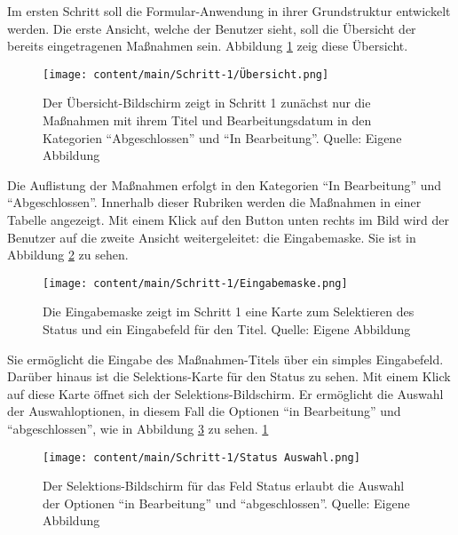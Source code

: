 

Im ersten Schritt soll die Formular-Anwendung  in ihrer Grundstruktur entwickelt werden. Die erste Ansicht, welche der Benutzer sieht, soll die Übersicht der bereits eingetragenen Maßnahmen sein. Abbildung \ref{fig:Schritt1Uebersicht} zeig diese Übersicht. 
\begin{figure}[H]
	\centering
    \texttt{[image: content/main/Schritt-1/Übersicht.png]}
	\caption[Schritt 1 Übersicht]{Der Übersicht-Bildschirm zeigt in  Schritt 1 zunächst nur die Maßnahmen mit ihrem Titel und Bearbeitungsdatum in den Kategorien \enquote{Abgeschlossen} und \enquote{In Bearbeitung}. Quelle: Eigene Abbildung}
	\label{fig:Schritt1Uebersicht}
\end{figure} 
Die Auflistung der Maßnahmen erfolgt in den Kategorien \enquote{In Bearbeitung} und \enquote{Abgeschlossen}. Innerhalb dieser Rubriken werden die Maßnahmen in einer Tabelle angezeigt. Mit einem Klick auf den Button unten rechts im Bild wird der Benutzer auf die zweite Ansicht weitergeleitet: die Eingabemaske. Sie ist in Abbildung \ref{fig:Schritt1Eingabemaske} zu sehen.
\begin{figure}[H]
	\centering
    \texttt{[image: content/main/Schritt-1/Eingabemaske.png]}
	\caption[Schritt 1 Eingabemaske]{Die Eingabemaske zeigt im Schritt 1 eine Karte zum Selektieren des Status und ein Eingabefeld für den Titel. Quelle: Eigene Abbildung}
	\label{fig:Schritt1Eingabemaske}
\end{figure} 
Sie ermöglicht die Eingabe des Maßnahmen-Titels über ein simples Eingabefeld. Darüber hinaus ist die Selektions-Karte für den Status zu sehen. Mit einem Klick auf diese Karte öffnet sich der Selektions-Bildschirm. Er ermöglicht die Auswahl der Auswahloptionen, in diesem Fall die Optionen \enquote{in Bearbeitung} und \enquote{abgeschlossen}, wie in Abbildung \ref{fig:Schritt1SelektionsBildschirmStatus} zu sehen.
\ref{fig:Schritt1Uebersicht}
\begin{figure}[H]
	\centering
    \texttt{[image: content/main/Schritt-1/Status Auswahl.png]}
	\caption[Schritt 1 Selektions-Bildschirm für Status]{Der Selektions-Bildschirm für das Feld Status erlaubt die Auswahl der Optionen \enquote{in Bearbeitung} und \enquote{abgeschlossen}. Quelle: Eigene Abbildung}
	\label{fig:Schritt1SelektionsBildschirmStatus}
\end{figure}

